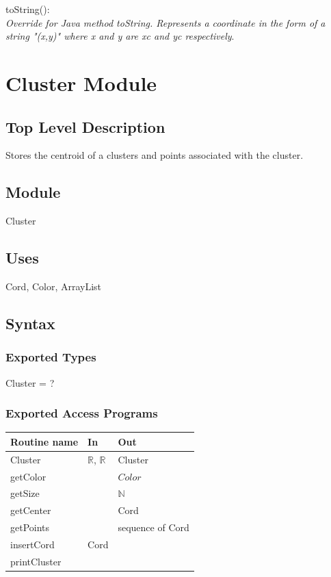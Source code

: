 \documentclass[12pt]{article}
\begin{document}
\noindent
toString():\\
\textit{Override for Java method toString. Represents a coordinate in the
form of a string "(x,y)" where x and y are xc and yc respectively}.

\newpage

\section*{Cluster Module}

\subsection* {Top Level Description}

Stores the centroid of a clusters and points associated with the cluster.

\subsection*{Module}

Cluster

\subsection* {Uses}

Cord, Color, ArrayList

\subsection* {Syntax}

\subsubsection* {Exported Types}

Cluster = ?

\subsubsection* {Exported Access Programs}

\begin{tabular}{| l | l | l |}
\hline
\textbf{Routine name} & \textbf{In} & \textbf{Out}\\
\hline
Cluster & $\mathbb{R}$, $\mathbb{R}$ & Cluster\\
\hline
getColor & ~ & $Color$\\
\hline
getSize & ~ & $\mathbb{N}$\\
\hline
getCenter & ~ & Cord \\
\hline
getPoints & ~ & sequence of Cord\\
\hline
insertCord & Cord & ~ \\
\hline
printCluster & ~ & ~ \\
\hline
\end{tabular}
\end{document}
